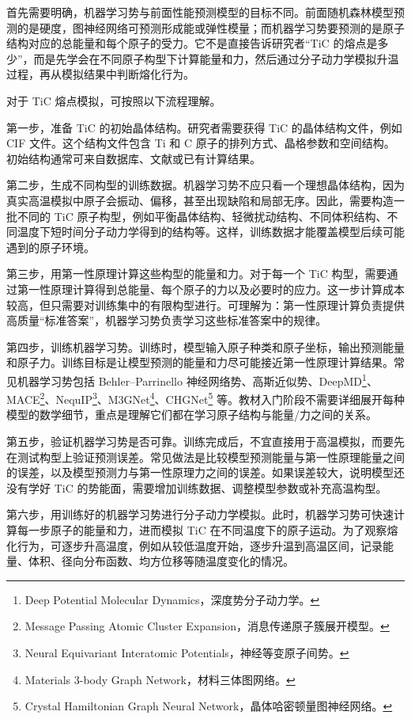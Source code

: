 首先需要明确，机器学习势与前面性能预测模型的目标不同。前面随机森林模型预测的是硬度，图神经网络可预测形成能或弹性模量；而机器学习势要预测的是原子结构对应的总能量和每个原子的受力。它不是直接告诉研究者“TiC 的熔点是多少”，而是先学会在不同原子构型下计算能量和力，然后通过分子动力学模拟升温过程，再从模拟结果中判断熔化行为。


对于 TiC 熔点模拟，可按照以下流程理解。


第一步，准备 TiC 的初始晶体结构。研究者需要获得 TiC 的晶体结构文件，例如 CIF 文件。这个结构文件包含 Ti 和 C 原子的排列方式、晶格参数和空间结构。初始结构通常可来自数据库、文献或已有计算结果。


第二步，生成不同构型的训练数据。机器学习势不应只看一个理想晶体结构，因为真实高温模拟中原子会振动、偏移，甚至出现缺陷和局部无序。因此，需要构造一批不同的 TiC 原子构型，例如平衡晶体结构、轻微扰动结构、不同体积结构、不同温度下短时间分子动力学得到的结构等。这样，训练数据才能覆盖模型后续可能遇到的原子环境。


第三步，用第一性原理计算这些构型的能量和力。对于每一个 TiC 构型，需要通过第一性原理计算得到总能量、每个原子的力以及必要时的应力。这一步计算成本较高，但只需要对训练集中的有限构型进行。可理解为：第一性原理计算负责提供高质量“标准答案”，机器学习势负责学习这些标准答案中的规律。


第四步，训练机器学习势。训练时，模型输入原子种类和原子坐标，输出预测能量和原子力。训练目标是让模型预测的能量和力尽可能接近第一性原理计算结果。常见机器学习势包括 Behler--Parrinello 神经网络势、高斯近似势、DeepMD\footnote{Deep Potential Molecular Dynamics，深度势分子动力学。}、MACE\footnote{Message Passing Atomic Cluster Expansion，消息传递原子簇展开模型。}、NequIP\footnote{Neural Equivariant Interatomic Potentials，神经等变原子间势。}、M3GNet\footnote{Materials 3-body Graph Network，材料三体图网络。}、CHGNet\footnote{Crystal Hamiltonian Graph Neural Network，晶体哈密顿量图神经网络。} 等。教材入门阶段不需要详细展开每种模型的数学细节，重点是理解它们都在学习原子结构与能量/力之间的关系。


第五步，验证机器学习势是否可靠。训练完成后，不宜直接用于高温模拟，而要先在测试构型上验证预测误差。常见做法是比较模型预测能量与第一性原理能量之间的误差，以及模型预测力与第一性原理力之间的误差。如果误差较大，说明模型还没有学好 TiC 的势能面，需要增加训练数据、调整模型参数或补充高温构型。


第六步，用训练好的机器学习势进行分子动力学模拟。此时，机器学习势可快速计算每一步原子的能量和力，进而模拟 TiC 在不同温度下的原子运动。为了观察熔化行为，可逐步升高温度，例如从较低温度开始，逐步升温到高温区间，记录能量、体积、径向分布函数、均方位移等随温度变化的情况。


